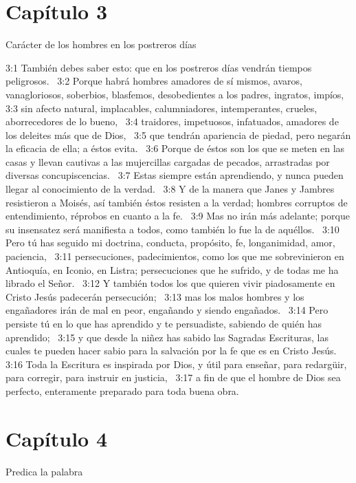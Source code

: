 \section*{Capítulo 3}
Carácter de los hombres en los postreros días  

3:1 También debes saber esto: que en los postreros días vendrán tiempos peligrosos.  
3:2 Porque habrá hombres amadores de sí mismos, avaros, vanagloriosos, soberbios, blasfemos, desobedientes a los padres, ingratos, impíos,  
3:3 sin afecto natural, implacables, calumniadores, intemperantes, crueles, aborrecedores de lo bueno,  
3:4 traidores, impetuosos, infatuados, amadores de los deleites más que de Dios,  
3:5 que tendrán apariencia de piedad, pero negarán la eficacia de ella; a éstos evita.  
3:6 Porque de éstos son los que se meten en las casas y llevan cautivas a las mujercillas cargadas de pecados, arrastradas por diversas concupiscencias.  
3:7 Estas siempre están aprendiendo, y nunca pueden llegar al conocimiento de la verdad.  
3:8 Y de la manera que Janes y Jambres resistieron a Moisés, así también éstos resisten a la verdad; hombres corruptos de entendimiento, réprobos en cuanto a la fe.  
3:9 Mas no irán más adelante; porque su insensatez será manifiesta a todos, como también lo fue la de aquéllos.  
3:10 Pero tú has seguido mi doctrina, conducta, propósito, fe, longanimidad, amor, paciencia,  
3:11 persecuciones, padecimientos, como los que me sobrevinieron en Antioquía, en Iconio, en Listra; persecuciones que he sufrido, y de todas me ha librado el Señor.  
3:12 Y también todos los que quieren vivir piadosamente en Cristo Jesús padecerán persecución;  
3:13 mas los malos hombres y los engañadores irán de mal en peor, engañando y siendo engañados.  
3:14 Pero persiste tú en lo que has aprendido y te persuadiste, sabiendo de quién has aprendido;  
3:15 y que desde la niñez has sabido las Sagradas Escrituras, las cuales te pueden hacer sabio para la salvación por la fe que es en Cristo Jesús.  
3:16 Toda la Escritura es inspirada por Dios, y útil para enseñar, para redargüir, para corregir, para instruir en justicia,  
3:17 a fin de que el hombre de Dios sea perfecto, enteramente preparado para toda buena obra.  
\section*{Capítulo 4}
Predica la palabra  

